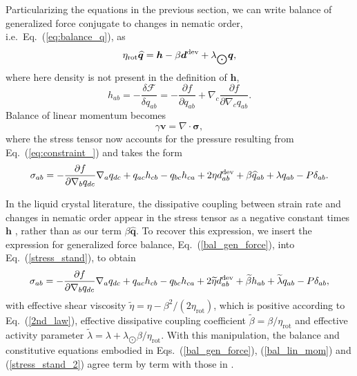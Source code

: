 \documentclass[12pt]{iopart}
\begin{document}
	Particularizing the equations in the previous section, we can write balance of generalized force conjugate to changes in nematic order, i.e.~Eq.~(\ref{eq:balance_q}), as
	\begin{equation}
		\label{bal_gen_force}
		\eta_{\text{rot}} \widehat{\bm{q}} = \bm{h} -  \beta  \bm{d}^{\rm dev} + \lambda_{\bigodot}\bm{q},
	\end{equation}
	where here density is not present in the definition of $\bm{h}$,
	\begin{equation}
		\label{nem_field2}
		h_{ab} = -\frac{\delta \mathcal{F}}{\delta {q}_{ab}} = -\frac{\partial f}{\partial {q}_{ab}} + \nabla_c  \frac{\partial f}{\partial \nabla_c {q}_{ab}}. 
			\end{equation}
	Balance of linear momentum becomes
	\begin{equation} 
		\label{bal_lin_mom}
		\gamma \bm{v} = \nabla\cdot\bm{\sigma},
	\end{equation}
where the stress tensor now accounts for the pressure  resulting from Eq.~(\ref{eq:constraint_}) and takes the form
	\begin{eqnarray}
		\label{stress_stand}
		{\sigma}_{ab}  =  -\frac{\partial  f}{\partial \nabla_b q_{dc}} \nabla_a q_{dc}  +  q_{ac} h_{cb} - q_{bc} h_{ca} + 2\eta {d}^{\rm dev}_{ab} + \beta \widehat{{q}}_{ab} + \lambda {q}_{ab} - P \delta_{ab}. 
	\end{eqnarray}
	
	In the liquid crystal literature, the dissipative coupling between strain rate and changes in nematic order appear in the stress tensor as a negative constant times $\bm{h}$ \cite{de1993}, rather than as our term $\beta \widehat{\bm{q}}$. To recover this expression, we insert the expression for generalized force balance, Eq.~(\ref{bal_gen_force}), into Eq.~(\ref{stress_stand}), to obtain
	\begin{equation}
		\label{stress_stand_2}
		{\sigma}_{ab}  = -\frac{\partial  f}{\partial \nabla_b q_{dc}} \nabla_a q_{dc}  +  q_{ac} h_{cb} - q_{bc} h_{ca} + 2\widetilde{\eta} {d}^{\rm dev}_{ab} + \widetilde{\beta} h_{ab} + \widetilde{\lambda} {q}_{ab} - P \delta_{ab},
	\end{equation}
	with effective shear viscosity $\widetilde{\eta} = \eta - \beta^2/(2\eta_{\text{rot}})$, which is positive according to Eq.~(\ref{2nd_law}), effective dissipative coupling coefficient $\widetilde{\beta}= \beta/{\eta_{\text{rot}}}$ and effective activity parameter $\widetilde{\lambda}= \lambda +  \lambda_{\bigodot} \beta/{\eta_{\text{rot}}}$. With this manipulation, the balance and constitutive equations embodied in Eqs.~(\ref{bal_gen_force}), (\ref{bal_lin_mom}) and (\ref{stress_stand_2}) agree term by term with those in \cite{julicher2018,salbreux2009}.
	
\end{document}
